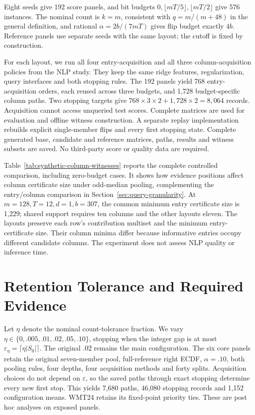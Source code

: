Eight seeds give 192 score panels, and bit budgets $0,\lfloor mT/5\rfloor,\lfloor mT/2\rfloor$ give 576 instances. The nominal count is $k=m$, consistent with $q=m/(m+48)$ in the general definition, and rational $\alpha=2b/(7mT)$ gives flip budget exactly $4b$. Reference panels use separate seeds with the same layout; the cutoff is fixed by construction.

For each layout, we run all four entry-acquisition and all three column-acquisition policies from the NLP study. They keep the same ridge features, regularization, query interfaces and both stopping rules. The 192 panels yield 768 entry-acquisition orders, each reused across three budgets, and 1,728 budget-specific column paths. Two stopping targets give $768\times3\times2+1{,}728\times2=8{,}064$ records. Acquisition cannot access unqueried test scores. Complete matrices are used for evaluation and offline witness construction. A separate replay implementation rebuilds explicit single-member flips and every first stopping state. Complete generated base, candidate and reference matrices, paths, results and witness subsets are saved. No third-party score or quality data are required.

Table~\ref{tab:synthetic-column-witnesses} reports the complete controlled comparison, including zero-budget cases. It shows how evidence positions affect column certificate size under odd-median pooling, complementing the entry/column comparison in Section~\ref{sec:query-granularity}. At $m=128,T=12,d=1,b=307$, the common minimum entry certificate size is 1,229; shared support requires ten columns and the other layouts eleven. The layouts preserve each row's contribution multiset and the minimum entry-certificate size. Their column minima differ because informative entries occupy different candidate columns. The experiment does not assess NLP quality or inference time.


\section{Retention Tolerance and Required Evidence}
\label{app:tolerance}
Let $\eta$ denote the nominal count-tolerance fraction. We vary $\eta\in\{0,.005,.01,.02,.05,.10\}$, stopping when the integer gap is at most $\varepsilon_\eta=\lceil\eta|S_0|\rceil$. The original $.02$ remains the main configuration. The six core panels retain the original seven-member pool, full-reference right ECDF, $\alpha=.10$, both pooling rules, four depths, four acquisition methods and forty splits. Acquisition choices do not depend on $\varepsilon$, so the saved paths through exact stopping determine every new first stop. This yields 7,680 paths, 46,080 stopping records and 1,152 configuration means. WMT24 retains its fixed-point priority ties. These are post hoc analyses on exposed panels.

